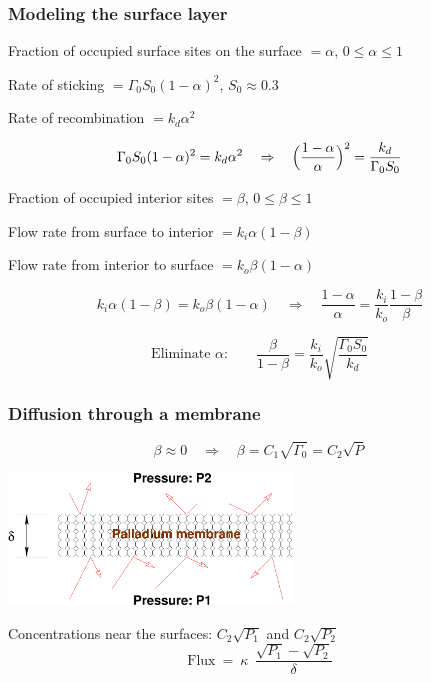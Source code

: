 \documentclass[10pt]{beamer}
\begin{document}
\begin{frame}
  \frametitle{Modeling the surface layer}

Fraction of occupied surface sites on the surface $ = \alpha$, \quad
$0 \le \alpha \le 1$

Rate of sticking $ = \Gamma_0 S_0 (1-\alpha)^2$, \quad $S_0 \approx 0.3$

Rate of recombination $=k_d \alpha^2$

\medskip

\[
  \Gamma_0 S_0 (1-\alpha)^2 = k_d \alpha^2
  \quad \Rightarrow \quad
  \Bigl(\frac{1-\alpha}{\alpha}\Bigr)^2 = \frac{k_d}{\Gamma_0 S_0}
\]

Fraction of occupied interior sites $ = \beta$, \quad $ 0 \le \beta \le 1$

Flow rate from surface to interior $ = k_i \alpha (1-\beta)$

Flow rate from interior to surface $ = k_o \beta (1-\alpha)$

\medskip

\[
  k_i \alpha (1-\beta) = k_o \beta (1-\alpha)
  \quad \Rightarrow \quad
  \frac{1-\alpha}{\alpha} = \frac{k_i}{k_o} \frac{1-\beta}{\beta}
\]

\[
  \text{Eliminate $\alpha$:} \qquad
  \frac{\beta}{1-\beta} = \frac{k_i}{k_o}
  \sqrt{\frac{\Gamma_0S_0}{k_d}} 
\]

\end{frame}

\begin{frame}
  \frametitle{Diffusion through a membrane}

\[
  \beta \approx 0 
  \quad \Rightarrow \quad
  \beta = C_1 \sqrt{\Gamma_0} = C_2 \sqrt{P}
\]

\medskip

\begin{center}
  \includegraphics[height=35mm]{p1p2.pdf}
\end{center}

\medskip

Concentrations near the surfaces: $C_2 \sqrt{P_1}$ and $C_2 \sqrt{P_2}$
\[
  \textrm{Flux}
  \: = \: \kappa \:\: \frac{\sqrt{P_1} - \sqrt{P_2}}{\delta}
\]

\end{frame}
\end{document}
